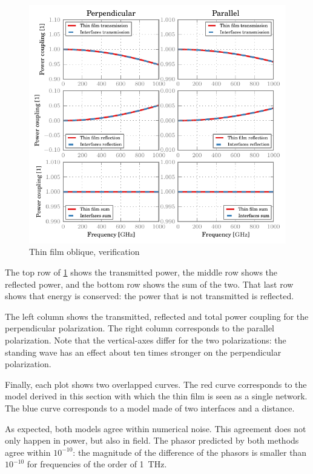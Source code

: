 \begin{figure}[hbtp]
    \centering
    \includegraphics{thin_film_oblique_verification}
    \caption{Thin film oblique, verification}
    \label{fig:thin_film_oblique_verification}
\end{figure}

The top row of \cref{fig:thin_film_oblique_verification} shows the transmitted power, the middle row shows the reflected power, and the bottom row shows the sum of the two.
That last row shows that energy is conserved: the power that is not transmitted is reflected.

The left column shows the transmitted, reflected and total power coupling for the perpendicular polarization.
The right column corresponds to the parallel polarization.
Note that the vertical-axes differ for the two polarizations: the standing wave has an effect about ten times stronger on the perpendicular polarization.

Finally, each plot shows two overlapped curves.
The red curve corresponds to the model derived in this section with which the thin film is seen as a single network.
The blue curve corresponds to a model made of two interfaces and a distance.

As expected, both models agree within numerical noise.
This agreement does not only happen in power, but also in field.
The phasor predicted by both methods agree within $10^{-10}$: the magnitude of the difference of the phasors is smaller than $10^{-10}$ for frequencies of the order of \SI{1}{\tera\hertz}.  



